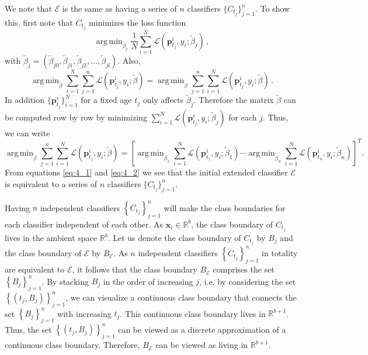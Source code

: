 \documentclass[a4paper,11pt]{article}
\DeclareMathOperator*{\argmin}{arg\,min}
\begin{document}
We note that $\mathscr{E}$ is the same as having a series of $n$ classifiers $\{C_{t_j}\}_{j=1}^n $. To show this, first note that $C_{t_j}$ minimizes the loss function
$$
  \argmin_{\tilde{\beta}_j} \frac{1}{N} \sum_{i=1}^N \mathscr{L} ( \bm{p}^i_{t_j},y_i;\tilde{\beta}_j ) \, ,
$$
with $\tilde{\beta}_j = ( \tilde{\beta}_{j0}, \tilde{\beta}_{j1}, \tilde{\beta}_{j2}, \dots, \tilde{\beta}_{jl})$. Also,
\begin{equation}\label{eq:4_1}
	\argmin_{\tilde{\beta}} \sum_{i=1}^N \sum_{j=1}^n \mathscr{L} ( \bm{p}^i_{t_j},y_i;\tilde{\beta}) = \argmin_{\tilde{\beta}} \sum_{j=1}^n \sum_{i=1}^N \mathscr{L} ( \bm{p}^i_{t_j},y_i;\tilde{\beta} ) \, .
\end{equation}
In addition $\{\bm{p}^i_{t_j}\}_{i=1}^N$ for a fixed age $t_j$ only affects $\tilde{\beta}_j$. Therefore the matrix $\tilde{\beta}$ can be computed row by row by minimizing $\sum_{i=1}^N \mathscr{L} \left( \bm{p}^i_{t_j},y_i;\tilde{\beta}_j \right)$ for each $j$. Thus, we can write
\begin{equation}\label{eq:4_2}
	\argmin_{\tilde{\beta}} \sum_{j=1}^n \sum_{i=1}^N \mathscr{L} \left( \bm{p}^i_{t_j},y_i;\tilde{\beta} \right) = \left[\argmin_{\tilde{\beta}_1} \sum_{i=1}^N \mathscr{L} \left( \bm{p}^i_{t_1},y_i;\tilde{\beta}_1 \right) \cdots \argmin_{\tilde{\beta}_n} \sum_{i=1}^N \mathscr{L} \left( \bm{p}^i_{t_n},y_i;\tilde{\beta}_n \right) \right]^T \!\!.
\end{equation}
From equations \eqref{eq:4_1} and \eqref{eq:4_2} we see that the initial extended classifier $\mathscr{E}$ is equivalent to a series of $n$ classifiers $\{C_{t_j}\}_{j=1}^n $.

Having $n$ independent classifiers $\left\{C_{t_j}\right\}_{j=1}^n$ will make the class boundaries for each classifier independent of each other. As $\bm{x}_i \in \mathbb{R}^b$, the class boundary of $C_{t_j}$ lives in the ambient space $\mathbb{R}^{b}$. Let us denote the class boundary of $C_{t_j}$ by $B_j$ and the class boundary of $\mathscr{E}$ by $B_{\mathscr{E}}$. As $n$ independent classifiers $\left \{C_{t_j} \right \}_{j=1}^n$ in totality are equivalent to $\mathscr{E}$, it follows that the class boundary $B_{\mathscr{E}}$ comprises the set $\left\{ B_j \right\}_{j=1}^n $. By stacking $B_j$ in the order of increasing $j$, i.e. by considering the set $\left \{ \left(t_j, B_j \right) \right \}_{j=1}^n $, we can visualize a continuous class boundary that connects the set $\left\{ B_j \right\}_{j=1}^n$ with increasing $t_j$. This continuous class boundary lives in $\mathbb{R}^{b+1}$. Thus, the set $\left \{ \left(t_j, B_j \right) \right \}_{j=1}^n$ can be viewed as a discrete approximation of a continuous class boundary. Therefore, $B_{\mathscr{E}}$ can be viewed as living in $\mathbb{R}^{b+1}$.
\end{document}
